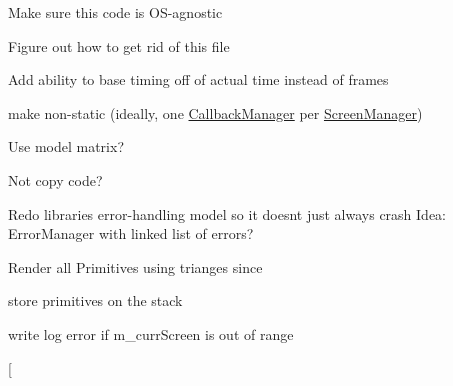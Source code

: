 
\begin{DoxyRefList}
\item[\label{todo__todo000006}%
\Hypertarget{todo__todo000006}%
Namespace \hyperlink{namespacenta}{nta} ]Make sure this code is O\+S-\/agnostic 

Figure out how to get rid of this file  
\item[\label{todo__todo000001}%
\Hypertarget{todo__todo000001}%
Class \hyperlink{classnta_1_1CallbackManager}{nta\+:\+:Callback\+Manager} ]Add ability to base timing off of actual time instead of frames 

make non-\/static (ideally, one \hyperlink{classnta_1_1CallbackManager}{Callback\+Manager} per \hyperlink{classnta_1_1ScreenManager}{Screen\+Manager})  
\item[\label{todo__todo000004}%
\Hypertarget{todo__todo000004}%
Member \hyperlink{structnta_1_1Glyph_a3b2afa4370140736d9d1b28de20d2105}{nta\+:\+:Glyph\+:\+:Glyph} (crvec4 pos\+Rect, crvec4 uv\+Rect, G\+Luint tex, float d, crvec4 col, float angle)]Use model matrix?  
\item[\label{todo__todo000007}%
\Hypertarget{todo__todo000007}%
Member \hyperlink{classnta_1_1IOManager_abbfd9da05b22aa488043a19344d38e0a}{nta\+:\+:I\+O\+Manager\+:\+:read\+File\+To\+Buffer} (crstring file\+Path, std\+::string \&buffer)]Not copy code?  
\item[\label{todo__todo000008}%
\Hypertarget{todo__todo000008}%
Member \hyperlink{classnta_1_1Logger_a08299f1414203eba74b306ce6712192e}{nta\+:\+:Logger\+:\+:write\+Error\+To\+Log} (crstring error)]Redo libraries error-\/handling model so it doesn\textquotesingle{}t just always crash Idea\+: Error\+Manager with linked list of errors?  
\item[\label{todo__todo000009}%
\Hypertarget{todo__todo000009}%
Member \hyperlink{classnta_1_1PrimitiveBatch_a8b1bcf740a16d65a79566c0a9aebd117}{nta\+:\+:Primitive\+Batch\+:\+:create\+Render\+Batches} ()]Render all Primitives using trianges since  
\item[\label{todo__todo000003}%
\Hypertarget{todo__todo000003}%
Member \hyperlink{classnta_1_1PrimitiveBatch_a85b1ab0111c7d02d5899f47fe1946c4f}{nta\+:\+:Primitive\+Batch\+:\+:m\+\_\+primitives} ]store primitives on the stack  
\item[\label{todo__todo000010}%
\Hypertarget{todo__todo000010}%
Member \hyperlink{classnta_1_1ScreenManager_a4b26e8adc481bfb37a088e047e4ccc2a}{nta\+:\+:Screen\+Manager\+:\+:get\+Curr\+Screen} () const]write log error if m\+\_\+curr\+Screen is out of range  
\item[\label{todo__todo000005}%

\end{DoxyRefList}
